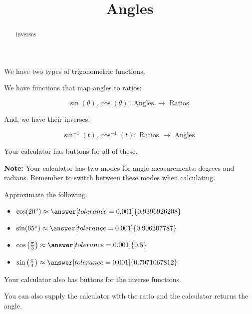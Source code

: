 \documentclass{ximera}
\title{Angles}
\begin{document}
\begin{abstract}
inverses
\end{abstract}
\maketitle




We have two types of trigonometric functions.


We have functions that map angles to ratios:


\[
\sin(\theta), \cos(\theta) :  \text{ Angles } \to \text{ Ratios }
\]


And, we have their inverses:



\[
\sin^{-1}(t), \cos^{-1}(t) :  \text{ Ratios } \to \text{ Angles }
\]








Your calculator has buttons for all of these.


\textbf{Note:}  Your calculator has two modes for angle measurements: degrees and radians.  Remember to switch between these modes when calculating.



\begin{question} 

Approximate the following.

\begin{itemize}
\item $\cos(20^{\circ}) \approx \answer[tolerance=0.001]{0.9396926208}$
\item $\sin(65^{\circ}) \approx \answer[tolerance=0.001]{0.906307787}$
\item $\cos\left( \frac{\pi}{3} \right) \approx \answer[tolerance=0.001]{0.5}$
\item $\sin\left( \frac{\pi}{4} \right) \approx \answer[tolerance=0.001]{0.7071067812}$
\end{itemize}

\end{question}





Your calculator also has buttons for the inverse functions. 




You can also supply the calculator with the ratio and the calculator returns the angle.
\end{document}
